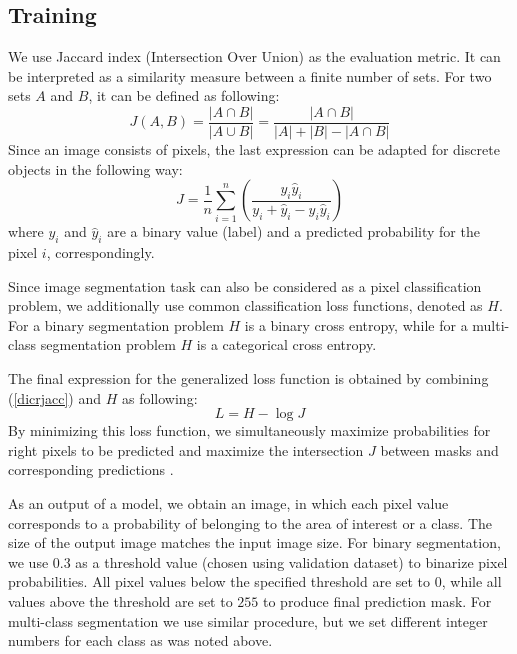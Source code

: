 \documentclass[runningheads,a4paper]{llncs}[2015/06/24]
\begin{document}
\subsection{Training}
We use Jaccard index (Intersection Over Union) as the evaluation metric. It can be interpreted as a similarity measure between a finite number of sets. For two sets $A$ and $B$, it can be defined as following:
\begin{equation}
\label{jaccard_iou}
    J(A, B) = \frac{|A\cap B|}{|A\cup B|} = \frac{|A\cap B|}{|A|+|B|-|A\cap B|}
\end{equation}
Since an image consists of pixels, the last expression can be adapted for discrete objects in the following way:
\begin{equation}
\label{dicrjacc}
J=\frac{1}{n}\sum\limits_{i=1}^n\left(\frac{y_i\hat{y}_i}{y_{i}+\hat{y}_i-y_i\hat{y}_i}\right)
\end{equation}
where $y_i$ and $\hat{y}_i$ are a binary value (label) and a predicted probability for the pixel $i$, correspondingly.

Since image segmentation task can also be considered as a pixel classification problem, we additionally use common classification loss functions, denoted as $H$. For a binary segmentation problem $H$ is a binary cross entropy, while for a multi-class segmentation problem $H$ is a categorical cross entropy.

The final expression for the generalized loss function is obtained by combining (\ref{dicrjacc}) and $H$ as following:
\begin{equation}
\label{free_en}
L=H-\log J
\end{equation}
By minimizing this loss function, we simultaneously maximize probabilities for right pixels to be predicted and maximize the intersection $J$ between masks and corresponding predictions \cite{iglovikov2017satellite}.

As an output of a model, we obtain an image, in which each pixel value corresponds to a probability of belonging to the area of interest or a class. The size of the output image matches the input image size. For binary segmentation, we use $0.3$ as a threshold value (chosen using validation dataset) to binarize pixel probabilities. All pixel values below the specified threshold are set to $0$, while all values above the threshold are set to $255$ to produce final prediction mask. For multi-class segmentation we use similar procedure, but we set different integer numbers for each class as was noted above.
\end{document}
